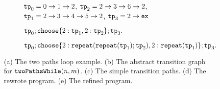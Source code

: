 {\begin{figure}
{\begin{subfigure}{.8\textwidth}
\begin{centering}
    $\mathtt{tp}_0 = 0 \to 1 \to 2$,
    $\mathtt{tp}_2 = 2 \to 3 \to 6 \to 2$, \\
    $\mathtt{tp}_1 = 2 \to 3 \to 4 \to 5 \to 2$,
    $\mathtt{tp}_3 = 2 \to \mathtt{ex}$\footnotemark
    \caption{}
\end{centering}
\end{subfigure}
}
{
\begin{subfigure}{.8\textwidth}
\begin{centering}
$
\tpath_0; 
\rpchoose{ 2: \tpath_1, 2: \tpath_2 }; \tpath_3.
$
\caption{}
\end{centering}
\end{subfigure}
}
\begin{subfigure}{.8\textwidth}
  \begin{centering}
  $
  \tpath_0 ; 
  \rpchoose{2: \rprepeat(\rprepeat(\tpath_1); \tpath_2), 
  2: \rprepeat(\tpath_1)}; \tpath_3.
  $
  \caption{}
\end{centering}
  \end{subfigure}
\caption{
(a) The two paths loop example.
(b) The abstract transition graph for $\mathtt{twoPathsWhile}(n, m)$.
(c) The simple transition paths.
(d) The rewrote program.
(e) The refined program.}
    \label{fig:whileTwoCounters-overview}
\end{figure}
}


